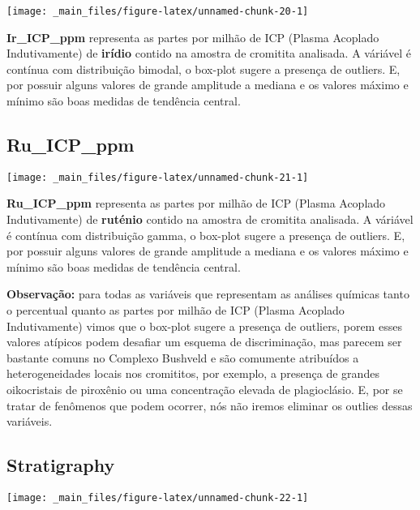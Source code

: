 \documentclass[
]{article}
\begin{document}
\begin{center}\texttt{[image: \_main\_files/figure-latex/unnamed-chunk-20-1]} \end{center}

\textbf{Ir\_ICP\_ppm} representa as partes por milhão de ICP (Plasma Acoplado Indutivamente) de \textbf{irídio} contido na amostra de cromitita analisada. A váriável é contínua com distribuição bimodal, o box-plot sugere a presença de outliers. E, por possuir alguns valores de grande amplitude a mediana e os valores máximo e mínimo são boas medidas de tendência central.

\hypertarget{ru_icp_ppm}{%
\subsection{Ru\_ICP\_ppm}\label{ru_icp_ppm}}

\begin{center}\texttt{[image: \_main\_files/figure-latex/unnamed-chunk-21-1]} \end{center}

\textbf{Ru\_ICP\_ppm} representa as partes por milhão de ICP (Plasma Acoplado Indutivamente) de \textbf{ruténio} contido na amostra de cromitita analisada. A váriável é contínua com distribuição gamma, o box-plot sugere a presença de outliers. E, por possuir alguns valores de grande amplitude a mediana e os valores máximo e mínimo são boas medidas de tendência central.

\textbf{Observação:} para todas as variáveis que representam as análises químicas tanto o percentual quanto as partes por milhão de ICP (Plasma Acoplado Indutivamente) vimos que o box-plot sugere a presença de outliers, porem esses valores atípicos podem desafiar um esquema de discriminação, mas parecem ser bastante comuns no Complexo Bushveld e são comumente atribuídos a heterogeneidades locais nos cromititos, por exemplo, a presença de grandes oikocristais de piroxênio ou uma concentração elevada de plagioclásio. E, por se tratar de fenômenos que podem ocorrer, nós não iremos eliminar os outlies dessas variáveis.

\hypertarget{stratigraphy}{%
\subsection{Stratigraphy}\label{stratigraphy}}

\begin{center}\texttt{[image: \_main\_files/figure-latex/unnamed-chunk-22-1]} \end{center}
\end{document}
